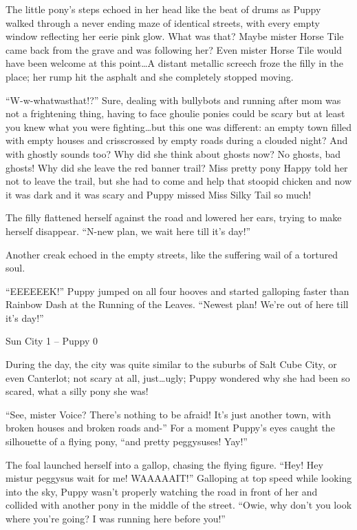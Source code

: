 The little pony's steps echoed in her head like the beat of drums as Puppy walked through a never ending maze of identical streets, with every empty window reflecting her eerie pink glow. What was that? Maybe mister Horse Tile came back from the grave and was following her? Even mister Horse Tile would have been welcome at this point\dots A distant metallic screech froze the filly in the place; her rump hit the asphalt and she completely stopped moving.

``W-w-whatwasthat!?'' Sure, dealing with bullybots and running after mom was not a frightening thing, having to face ghoulie ponies could be scary but at least you knew what you were fighting\dots but this one was different: an empty town filled with empty houses and crisscrossed by empty roads during a clouded night? And with ghostly sounds too? Why did she think about ghosts now? No ghosts, bad ghosts! Why did she leave the red banner trail? Miss pretty pony Happy told her not to leave the trail, but she had to come and help that stoopid chicken and now it was dark and it was scary and Puppy missed Miss Silky Tail so much!

The filly flattened herself against the road and lowered her ears, trying to make herself disappear. ``N-new plan, we wait here till it's day!''

Another creak echoed in the empty streets, like the suffering wail of a tortured soul.

``EEEEEEK!'' Puppy jumped on all four hooves and started galloping faster than Rainbow Dash at the Running of the Leaves. ``Newest plan! We're out of here till it's day!''

\begin{center}
Sun City 1 -- Puppy 0    
\end{center}

\horizonline


During the day, the city was quite similar to the suburbs of Salt Cube City, or even Canterlot; not scary at all, just\dots ugly; Puppy wondered why she had been so scared, what a silly pony she was!

``See, mister Voice? There's nothing to be afraid! It's just another town, with broken houses and broken roads and-'' For a moment Puppy's eyes caught the silhouette of a flying pony, ``and pretty peggysuses! Yay!''

The foal launched herself into a gallop, chasing the flying figure. ``Hey! Hey mistur peggysus wait for me! WAAAAAIT!'' Galloping at top speed while looking into the sky, Puppy wasn't properly watching the road in front of her and collided with another pony in the middle of the street. ``Owie, why don't you look where you're going? I was running here before you!''

